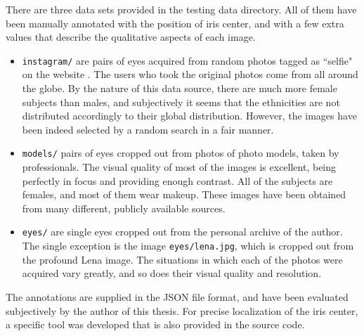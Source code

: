 There are three data sets provided in the testing data directory.
All of them have been manually annotated with the position of iris center, and with a few extra values that describe the qualitative aspects of each image.

\begin{itemize}
\item {\tt instagram/} are pairs of eyes acquired from random photos tagged as ``selfie" on the website .
The users who took the original photos come from all around the globe.
By the nature of this data source, there are much more female subjects than males, and subjectively it seems that the ethnicities are not distributed accordingly to their global distribution.
However, the images have been indeed selected by a random search in a fair manner.

\item {\tt models/} pairs of eyes cropped out from photos of photo models, taken by professionals.
The visual quality of most of the images is excellent, being perfectly in focus and providing enough contrast.
All of the subjects are females, and most of them wear makeup.
These images have been obtained from many different, publicly available sources.

\item {\tt eyes/} are single eyes cropped out from the personal archive of the author.
The single exception is the image {\tt eyes/lena.jpg}, which is cropped out from the profound Lena image.
The situations in which each of the photos were acquired vary greatly, and so does their visual quality and resolution.
\end{itemize}

The annotations are supplied in the JSON file format, and have been evaluated subjectively by the author of this thesis.
For precise localization of the iris center, a specific tool was developed that is also provided in the source code.
